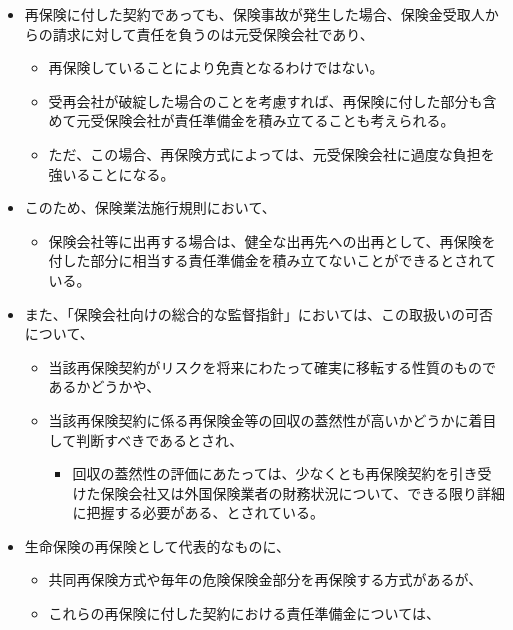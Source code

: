 \documentclass[report,gutter=10mm,fore-edge=10mm,uplatex,dvipdfmx]{jlreq}
\begin{document}
\begin{itemize}
\tightlist
\item
  再保険に付した契約であっても、保険事故が発生した場合、保険金受取人からの請求に対して責任を負うのは元受保険会社であり、

  \begin{itemize}
  \tightlist
  \item
    再保険していることにより免責となるわけではない。
  \item
    受再会社が破綻した場合のことを考慮すれば、再保険に付した部分も含めて元受保険会社が責任準備金を積み立てることも考えられる。
  \item
    ただ、この場合、再保険方式によっては、元受保険会社に過度な負担を強いることになる。
  \end{itemize}
\item
  このため、保険業法施行規則において、

  \begin{itemize}
  \tightlist
  \item
    保険会社等に出再する場合は、健全な出再先への出再として、再保険を付した部分に相当する責任準備金を積み立てないことができるとされている。
  \end{itemize}
\item
  また、「保険会社向けの総合的な監督指針」においては、この取扱いの可否について、

  \begin{itemize}
  \tightlist
  \item
    当該再保険契約がリスクを将来にわたって確実に移転する性質のものであるかどうかや、
  \item
    当該再保険契約に係る再保険金等の回収の蓋然性が高いかどうかに着目して判断すべきであるとされ、

    \begin{itemize}
    \tightlist
    \item
      回収の蓋然性の評価にあたっては、少なくとも再保険契約を引き受けた保険会社又は外国保険業者の財務状況について、できる限り詳細に把握する必要がある、とされている。
    \end{itemize}
  \end{itemize}
\item
  生命保険の再保険として代表的なものに、

  \begin{itemize}
  \tightlist
  \item
    共同再保険方式や毎年の危険保険金部分を再保険する方式があるが、
  \item
    これらの再保険に付した契約における責任準備金については、


\end{itemize}
\end{itemize}
\end{document}
